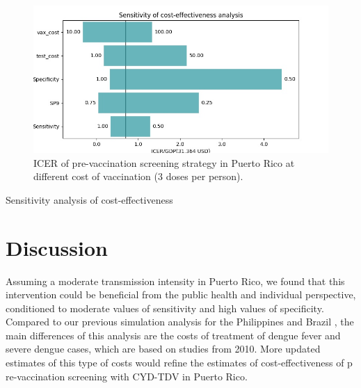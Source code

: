 \documentclass[12pt]{article}
\begin{document}
\begin{figure}[H]
  \centering \includegraphics[width=.8\linewidth]{../analysis/figures/report_figure_tornado_diagram.jpeg}
  \caption{\label{fig-tornado}ICER of pre-vaccination screening strategy in Puerto Rico at different cost of vaccination (3 doses per person).}  
\end{figure}

\begin{table}[ht]
  \centering
  
  \caption{\label{table-tornado}Sensitivity analysis of cost-effectiveness}   
\end{table}

\section{Discussion}
Assuming a moderate transmission intensity in Puerto Rico, we found that this intervention could be beneficial from the public health and individual perspective, conditioned to moderate values of sensitivity and high values of specificity. Compared to our previous simulation analysis for the Philippines and Brazil \cite{Espana2019Biorxiv}, the main differences of this analysis are the costs of treatment of dengue fever and severe dengue cases, which are based on studies from 2010. More updated estimates of this type of costs would refine the estimates of cost-effectiveness of p re-vaccination screening with CYD-TDV in Puerto Rico. 

 
 
\end{document}
